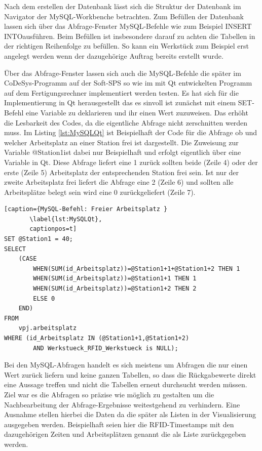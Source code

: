  Nach dem erstellen der Datenbank lässt sich die Struktur der Datenbank im Navigator der MySQL-Workbenche betrachten. Zum Befüllen der Datenbank lassen sich über das Abfrage-Fenster MySQL-Befehle wie zum Beispiel \glqq INSERT INTO\grqq  ausführen. Beim Befüllen ist insbesondere darauf zu achten die Tabellen in der richtigen Reihenfolge zu befüllen. So kann ein Werkstück zum Beispiel erst angelegt werden wenn der dazugehörige Auftrag bereits erstellt wurde.
 
 Über das Abfrage-Fenster lassen sich auch die MySQL-Befehle die später im CoDeSys-Programm auf der Soft-SPS so wie im mit Qt entwickelten Programm auf dem Fertigungsrechner implementiert werden testen. Es hat sich für die Implementierung in Qt herausgestellt das es sinvoll ist zunächst mit einem SET-Befehl eine Variable zu deklarieren und ihr einen Wert zuzuweisen. Das erhöht die Lesbarkeit des Codes, da die eigentliche Abfrage nicht zerschnitten werden muss. Im Listing \ref{lst:MySQLQt} ist Beispielhaft der Code für die Abfrage ob und welcher Arbeitsplatz an einer Station frei ist dargestellt. Die Zuweisung zur Variable \glqq @Station1\grqq  ist dabei nur Beispielhaft und erfolgt eigentlich über eine Variable in Qt. Diese Abfrage liefert eine 1 zurück sollten beide (Zeile 4) oder der erste (Zeile 5) Arbeitsplatz der entsprechenden Station frei sein. Ist nur der zweite Arbeitsplatz frei liefert die Abfrage eine 2 (Zeile 6) und sollten alle Arbeitsplätze belegt sein  wird eine 0 zurückgeliefert (Zeile 7).
 

\begin{lstlisting}[caption={MySQL-Befehl: Freier Arbeitsplatz }
       \label{lst:MySQLQt},
       captionpos=t] 
SET @Station1 = 40; 
SELECT
    (CASE
        WHEN(SUM(id_Arbeitsplatz))=@Station1+1+@Station1+2 THEN 1 
        WHEN(SUM(id_Arbeitsplatz))=@Station1+1 THEN 1 
        WHEN(SUM(id_Arbeitsplatz))=@Station1+2 THEN 2 
        ELSE 0 
    END) 
FROM 
    vpj.arbeitsplatz 
WHERE (id_Arbeitsplatz IN (@Station1+1,@Station1+2) 
        AND Werkstueck_RFID_Werkstueck is NULL);
\end{lstlisting}

Bei den MySQL-Abfragen handelt es sich meistens um Abfragen die nur einen Wert zurück liefern und keine ganzen Tabellen, so dass die Rückgabewerte direkt eine Aussage treffen und nicht die  Tabellen erneut durchsucht werden müssen. Ziel war es die Abfragen so präzise wie möglich zu gestalten um die Nachbearbeitung der Abfrage-Ergebnisse weitestgehend zu verhindern. Eine Ausnahme stellen hierbei die Daten da die später als Listen in der Visualisierung ausgegeben werden. Beispielhaft seien hier die RFID-Timestamps mit den dazugehörigen Zeiten und Arbeitsplätzen genannt die als Liste zurückgegeben werden.

